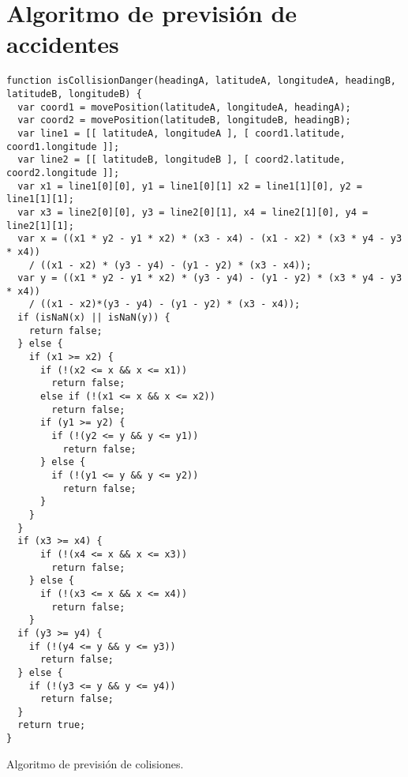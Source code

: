 \section{Algoritmo de previsión de accidentes}\label{apendice:posicion_relative}
\begin{listing}
	\begin{minipage}{.4\textwidth}
		\begin{verbatim}
function isCollisionDanger(headingA, latitudeA, longitudeA, headingB, latitudeB, longitudeB) {
  var coord1 = movePosition(latitudeA, longitudeA, headingA);
  var coord2 = movePosition(latitudeB, longitudeB, headingB);
  var line1 = [[ latitudeA, longitudeA ], [ coord1.latitude, coord1.longitude ]];
  var line2 = [[ latitudeB, longitudeB ], [ coord2.latitude, coord2.longitude ]];	
  var x1 = line1[0][0], y1 = line1[0][1] x2 = line1[1][0], y2 = line1[1][1];
  var x3 = line2[0][0], y3 = line2[0][1], x4 = line2[1][0], y4 = line2[1][1];
  var x = ((x1 * y2 - y1 * x2) * (x3 - x4) - (x1 - x2) * (x3 * y4 - y3 * x4)) 
    / ((x1 - x2) * (y3 - y4) - (y1 - y2) * (x3 - x4));
  var y = ((x1 * y2 - y1 * x2) * (y3 - y4) - (y1 - y2) * (x3 * y4 - y3 * x4))
    / ((x1 - x2)*(y3 - y4) - (y1 - y2) * (x3 - x4));
  if (isNaN(x) || isNaN(y)) {
    return false;
  } else {
    if (x1 >= x2) {
      if (!(x2 <= x && x <= x1))
        return false; 
      else if (!(x1 <= x && x <= x2))
        return false; 
      if (y1 >= y2) {
        if (!(y2 <= y && y <= y1))
          return false;
      } else {
        if (!(y1 <= y && y <= y2))
          return false;
      }
    }
  }
  if (x3 >= x4) {
      if (!(x4 <= x && x <= x3)) 
        return false;
    } else {
      if (!(x3 <= x && x <= x4)) 
        return false;
    }	
  if (y3 >= y4) {
    if (!(y4 <= y && y <= y3))
      return false;
  } else {
    if (!(y3 <= y && y <= y4)) 
      return false;
  }
  return true;	
}
\end{verbatim}
\end{minipage}
\caption{Algoritmo de previsión de colisiones.}\label{alg:deteccion_colisiones}
\end{listing}
